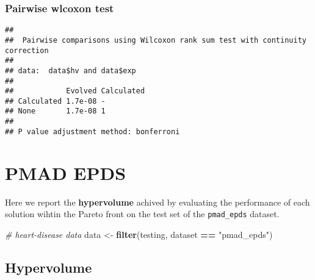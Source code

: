 \documentclass[
]{book}
\newenvironment{Shaded}{\begin{snugshade}}{\end{snugshade}}
\newcommand{\AttributeTok}[1]{\textcolor[rgb]{0.13,0.29,0.53}{#1}}
\newcommand{\CommentTok}[1]{\textcolor[rgb]{0.56,0.35,0.01}{\textit{#1}}}
\newcommand{\ConstantTok}[1]{\textcolor[rgb]{0.56,0.35,0.01}{#1}}
\newcommand{\FunctionTok}[1]{\textcolor[rgb]{0.13,0.29,0.53}{\textbf{#1}}}
\newcommand{\NormalTok}[1]{#1}
\newcommand{\OtherTok}[1]{\textcolor[rgb]{0.56,0.35,0.01}{#1}}
\newcommand{\SpecialCharTok}[1]{\textcolor[rgb]{0.81,0.36,0.00}{\textbf{#1}}}
\newcommand{\StringTok}[1]{\textcolor[rgb]{0.31,0.60,0.02}{#1}}
\begin{document}
\hypertarget{pairwise-wlcoxon-test-9}{%
\subsection{Pairwise wlcoxon test}\label{pairwise-wlcoxon-test-9}}

\begin{Shaded}
\end{Shaded}

\begin{verbatim}
## 
##  Pairwise comparisons using Wilcoxon rank sum test with continuity correction 
## 
## data:  data$hv and data$exp 
## 
##            Evolved Calculated
## Calculated 1.7e-08 -         
## None       1.7e-08 1         
## 
## P value adjustment method: bonferroni
\end{verbatim}

\hypertarget{pmad-epds}{%
\chapter{PMAD EPDS}\label{pmad-epds}}

Here we report the \textbf{hypervolume} achived by evaluating the performance of each solution wihtin the Pareto front on the test set of the \texttt{pmad\_epds} dataset.

\begin{Shaded}
\begin{Highlighting}[]
\CommentTok{\# heart{-}disease data}
\NormalTok{data }\OtherTok{\textless{}{-}} \FunctionTok{filter}\NormalTok{(testing, dataset }\SpecialCharTok{==} \StringTok{"pmad\_epds"}\NormalTok{)}
\end{Highlighting}
\end{Shaded}

\hypertarget{hypervolume-10}{%
\section{Hypervolume}\label{hypervolume-10}}
\end{document}
